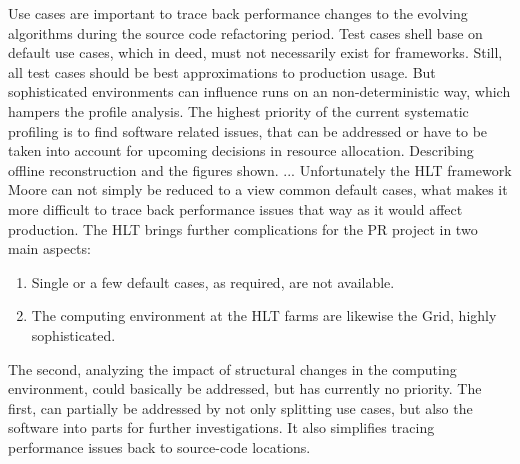 \documentclass[a4paper]{jpconf}
\begin{document}
Use cases are important to trace back performance changes to the evolving algorithms during the source code refactoring period. Test cases shell base on default use cases, which in deed, must not necessarily exist for frameworks. Still, all test cases should be best approximations to production usage. But sophisticated environments can influence runs on an non-deterministic way, which hampers the profile analysis. The highest priority of the current systematic profiling is to find software related issues, that can be addressed or have to be taken into account for upcoming decisions in resource allocation.
\newline
Describing offline reconstruction and the figures shown. ...
\newline
Unfortunately the HLT framework Moore can not simply be reduced to a view common default cases, what makes it more difficult to trace back performance issues that way as it would affect production. The HLT brings further complications for the PR project in two main aspects:
\begin{enumerate}
 \item Single or a few default cases, as required, are not available.
 \item The computing environment at the HLT farms are likewise the Grid, highly sophisticated.
\end{enumerate}
The second, analyzing the impact of structural changes in the computing environment, could basically be addressed, but has currently no priority. The first, can partially be addressed by not only splitting use cases, but also the software into parts for further investigations. It also simplifies tracing performance issues back to source-code locations. 
\end{document}
